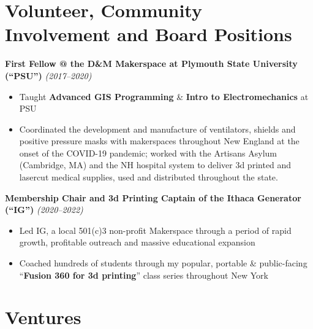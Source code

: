 \documentclass[11pt,letterpaper]{article}
\newcommand{\role}[2]{%
    \noindent\textbf{\color{secondary}#1} \hfill \textit{\color{muted}(#2)}\par\vspace{0.3em}
}
\begin{document}
\section{Volunteer, Community Involvement and Board Positions}
\label{sec:volunteer}

\role{First Fellow @ the D\&M Makerspace at Plymouth State University (``PSU'')}{2017--2020}

\begin{itemize}
    \item Taught \textbf{Advanced GIS Programming} \& \textbf{Intro to Electromechanics} at PSU
    \item Coordinated the development and manufacture of ventilators, shields and positive pressure masks with makerspaces throughout New England at the onset of the COVID-19 pandemic; worked with the Artisans Asylum (Cambridge, MA) and the NH hospital system to deliver 3d printed and lasercut medical supplies, used and distributed throughout the state.
\end{itemize}

\vspace{0.5em}

\role{Membership Chair and 3d Printing Captain of the Ithaca Generator (``IG'')}{2020--2022}

\begin{itemize}
    \item Led IG, a local 501(c)3 non-profit Makerspace through a period of rapid growth, profitable outreach and massive educational expansion
    \item Coached hundreds of students through my popular, portable \& public-facing ``\textbf{Fusion 360 for 3d printing}'' class series throughout New York
\end{itemize}

\newpage

\section{Ventures}
\label{sec:ventures}
\end{document}
